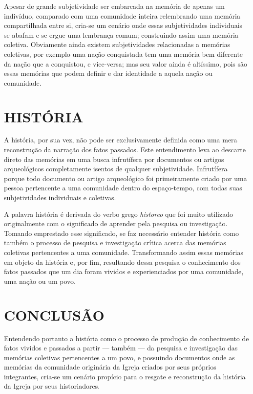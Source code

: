 \documentclass[
    article,            %
	12pt,				%
	oneside,			%
	a4paper,			%
	english,			%
	french,				%
	spanish,			%
	brazil				%
	]{abntex2}
\begin{document}
Apesar de grande subjetividade ser embarcada na memória de apenas um indivíduo, comparado com uma comunidade inteira relembrando uma memória compartilhada entre si, cria-se um cenário onde essas subjetividades individuais se abafam e se ergue uma lembrança comum; construindo assim uma memória coletiva. Obviamente ainda existem subjetividades relacionadas a memórias coletivas, por exemplo uma nação conquistada tem uma memória bem diferente da nação que a conquistou, e vice-versa; mas seu valor ainda é altíssimo, pois são essas memórias que podem definir e dar identidade a aquela nação ou comunidade.

\section{HISTÓRIA}
A história, por sua vez, não pode ser exclusivamente definida como uma mera reconstrução da narração dos fatos passados. Este entendimento leva ao descarte direto das memórias em uma busca infrutífera por documentos ou artigos arqueológicos completamente isentos de qualquer subjetividade. Infrutífera porque todo documento ou artigo arqueológico foi primeiramente criado por uma pessoa pertencente a uma comunidade dentro do espaço-tempo, com todas suas subjetividades individuais e coletivas.

A palavra história é derivada do verbo grego \emph{historeo} que foi muito utilizado originalmente com o significado de aprender pela pesquisa ou investigação. Tomando emprestado esse significado, se faz necessário entender história como também o processo de pesquisa e investigação crítica acerca das memórias coletivas pertencentes a uma comunidade. Transformando assim essas memórias em objeto da história e, por fim, resultando dessa pesquisa o conhecimento dos fatos passados que um dia foram vividos e experienciados por uma comunidade, uma nação ou um povo.

\section{CONCLUSÃO}
Entendendo portanto a história como o processo de produção de conhecimento de fatos vividos e passados a partir --- também --- da pesquisa e investigação das memórias coletivas pertencentes a um povo, e possuindo documentos onde as memórias da comunidade originária da Igreja criados por seus próprios integrantes, cria-se um cenário propício para o resgate e reconstrução da história da Igreja por seus historiadores.



% 
\end{document}
